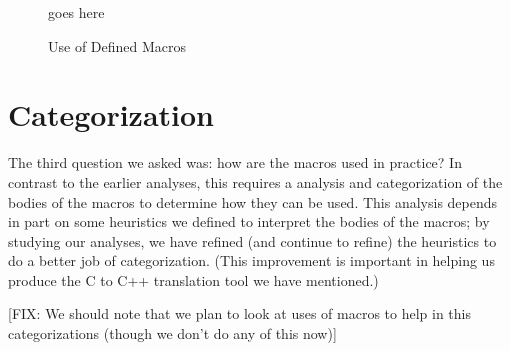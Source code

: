 \begin{figure}
goes here

\caption{Use of Defined Macros\label{fig:define_usage}}
\end{figure}


\section{Categorization}\label{sec:categorization}

The third question we asked was: how are the macros used in practice?
In contrast to the earlier analyses, this requires a analysis and
categorization of the bodies of the macros to determine how they can
be used.  This analysis depends in part on some heuristics we defined
to interpret the bodies of the macros; by studying our analyses, we
have refined (and continue to refine) the heuristics to do a better
job of categorization.  (This improvement is important in helping us
produce the C to C++ translation tool we have mentioned.)

[FIX: We should note that we plan to look at uses of macros to help in
this categorizations (though we don't do any of this now)]

